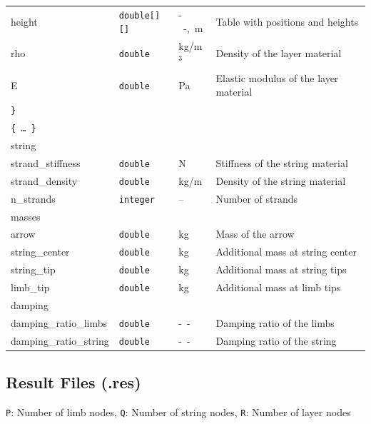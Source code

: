 \documentclass[12pt]{article}
\begin{document}
\begin{table}[H]
{\begin{tabular}{ l | l | l | l }
\quad\quad height & \texttt{double[][]} & \unit[]{--},\ \unit[]{m} & Table with positions and heights \\
\quad\quad rho & \texttt{double} & \unit[]{kg/m$^3$} & Density of the layer material \\
\quad\quad E & \texttt{double} & \unit[]{Pa} & Elastic modulus of the layer material \\
\quad \texttt{\}} & & & \\
\quad\texttt{\{\ \ldots\ \}} & & & \\
\tablespace string & & & \\
\quad strand\_stiffness & \texttt{double} & \unit[]{N} & Stiffness of the string material\\
\quad strand\_density & \texttt{double} & \unit[]{kg/m} & Density of the string material \\
\quad n\_strands & \texttt{integer} & -- & Number of strands \\
\tablespace masses & & & \\
\quad arrow & \texttt{double} & \unit[]{kg} & Mass of the arrow \\
\quad string\_center & \texttt{double} & \unit[]{kg} & Additional mass at string center \\
\quad string\_tip & \texttt{double} & \unit[]{kg} & Additional mass at string tips \\
\quad limb\_tip & \texttt{double} & \unit[]{kg} & Additional mass at limb tips \\
\tablespace damping & & & \\
\quad damping\_ratio\_limbs & \texttt{double} & \unit[]{--} & Damping ratio of the limbs \\
\quad damping\_ratio\_string & \texttt{double} & \unit[]{--} & Damping ratio of the string
\end{tabular}}
\end{table}

\newpage
\subsection{Result Files (.res)}
\label{sec:output-structure}

\footnotesize{
\texttt{P}: Number of limb nodes, \texttt{Q}: Number of string nodes, \texttt{R}: Number of layer nodes
}
\end{document}
